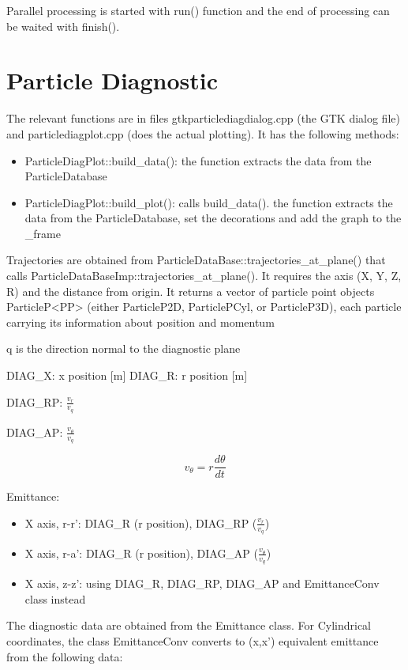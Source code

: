 \documentclass[12pt,a4paper]{article}
\begin{document}
Parallel processing is started with run() function and the end of
processing can be waited with finish().






\section{Particle Diagnostic}

The relevant functions are in files gtkparticlediagdialog.cpp (the GTK dialog file) and particlediagplot.cpp (does the actual plotting). It has the following methods:

\begin{itemize}
	\item ParticleDiagPlot::build\_data(): the function extracts the data from the ParticleDatabase
	\item ParticleDiagPlot::build\_plot(): calls build\_data(). the function extracts the data from the ParticleDatabase, set the decorations and add the graph to the \_frame
\end{itemize}


Trajectories are obtained from ParticleDataBase::trajectories\_at\_plane() that calls ParticleDataBaseImp::trajectories\_at\_plane(). It requires the axis (X, Y, Z, R) and the distance from origin. It returns a vector of particle point objects ParticleP<PP> (either ParticleP2D, ParticlePCyl, or ParticleP3D), each particle carrying its information about position and momentum

q is the direction normal to the diagnostic plane

DIAG\_X: x position [m]
DIAG\_R: r position [m]



DIAG\_RP: $\frac{v_r}{v_q}$

DIAG\_AP: $\frac{v_\theta}{v_q}$

$$v_\theta=r\frac{d\theta}{dt}$$

Emittance:
\begin{itemize}
	\item X axis, r-r': DIAG\_R (r position), DIAG\_RP ($\frac{v_r}{v_q}$)
	\item X axis, r-a': DIAG\_R (r position), DIAG\_AP ($\frac{v_\theta}{v_q}$)
	\item X axis, z-z': using DIAG\_R, DIAG\_RP, DIAG\_AP and EmittanceConv class instead
\end{itemize}


The diagnostic data are obtained from the Emittance class. For Cylindrical coordinates, the class EmittanceConv converts to (x,x') equivalent emittance from the following data:
\end{document}

